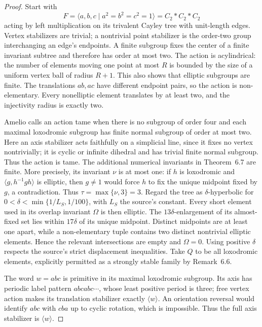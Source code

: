\begin{proof}
Start with
\[
 F=\langle a,b,c\mid a^2=b^2=c^2=1\rangle=C_2*C_2*C_2
\]
acting by left multiplication on its trivalent Cayley tree with
unit-length edges. Vertex stabilizers are trivial; a nontrivial point
stabilizer is the order-two group interchanging an edge's endpoints.
A finite subgroup fixes the center of a finite invariant subtree and
therefore has order at most two.
The action is acylindrical: the number of elements moving one point
at most \(R\) is bounded by the size of a uniform vertex ball of radius
\(R+1\). This also shows that elliptic subgroups are finite.
The translations \(ab,ac\) have different endpoint pairs, so the action
is non-elementary. Every nonelliptic element translates by at least two,
and the injectivity radius is exactly two.

Amelio calls an action tame when there is no subgroup of order four
and each maximal loxodromic subgroup has finite normal subgroup of
order at most two. Here an axis stabilizer acts faithfully on a
simplicial line, since it fixes no vertex nontrivially; it is cyclic
or infinite dihedral and has trivial finite normal subgroup.
Thus the action is tame.
The additional numerical invariants in Theorem~6.7 are finite.
More precisely, its invariant \(\nu\) is at most one:
if \(h\) is loxodromic and \(\langle g,h^{-1}gh\rangle\) is elliptic,
then \(g\ne1\) would force \(h\) to fix the unique midpoint fixed by
\(g\), a contradiction. Thus \(\tau=\max\{\nu,3\}=3\).
Regard the tree as \(\delta\)-hyperbolic for
\(0<\delta<\min\{1/L_S,1/100\}\), with \(L_S\) the source's constant.
Every short element used in its overlap invariant \(\Omega\) is then
elliptic. The \(13\delta\)-enlargement of its almost-fixed set lies
within \(17\delta\) of its unique midpoint.
Distinct midpoints are at least one apart, while a non-elementary
tuple contains two distinct nontrivial elliptic elements.
Hence the relevant intersections are empty and \(\Omega=0\).
Using positive \(\delta\) respects the source's strict displacement
inequalities. Take \(Q\) to be all loxodromic elements, explicitly
permitted as a strongly stable family by Remark~6.6.

The word \(w=abc\) is primitive in its maximal loxodromic subgroup.
Its axis has periodic label pattern \(abcabc\cdots\), whose least
positive period is three; free vertex action makes its translation
stabilizer exactly \(\langle w\rangle\).
An orientation reversal would identify \(abc\) with \(cba\) up to
cyclic rotation, which is impossible. Thus the full axis stabilizer
is \(\langle w\rangle\).


\end{proof}
